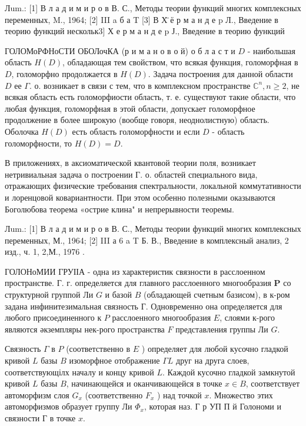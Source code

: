 \documentclass[10pt]{article}
\begin{document}
Лum.: [1] В л а д и м и р о в В. С., Методы теории функций многих комплексных переменных, M., 1964; [2] III a б а T [3] В Х̈ ё р м а н д е p Л., Введение в теорию функций нескольк3] Х е р м а н д е p Ј., Введение в теорию функций



ГОЛОМоРФНоСТИ ОБОЛочКА (р и м а н о в о й) о б л а с т и $D$ - наибольшая область $H(D)$, обладающая тем свойством, что всякая функция, голоморфная в $D$, голоморфно продолжается в $H(D)$. Задача построения для данной области $D$ ее $\Gamma$. о. возникает в связи с тем, что в комплексном пространстве $\mathbb{C}^{n}, n \geqslant 2$, не всякая область есть голоморфиости область, т. е. существуют такие области, что любая функция, голоморфная в этой области, допускает голоморфное продолжение в более широкую (вообще говоря, неоднолистную) область. Оболочка $H(D)$ есть область голоморфности и если $D$ - область голоморфности, то $H(D)=D$.



В приложениях, в аксиоматической квантовой теории поля, возникает нетривиальная задача о построении Г. о. областей специального вида, отражающих физические требования спектральности, локальной коммутативности и лоренцовой ковариантности. При этом особенно полезными оказываются Боголюбова теорема «острие клина" и непрерывности теоремы.



Лum.: [1] В л а д и м и р о в В. С., Методы теории функций многих комплексных переменных, М., 1964; [2] III а 6 a T Б. В., Введение в комплексный анализ, 2 изд., ч. 1, 2,М., 1976 .



ГОЛОНоМИИ ГРУІІА - одна из характеристик связности в расслоенном пространстве. Г. г. определяется для главного расслоенного многообразия $\boldsymbol{P}$ со структурной группой Ли $G$ и базой $B$ (обладающей счетным базисом), в к-ром задана инфинитезимальная связность $Г$. Одновременно она определяется для любого присоединенного к $P$ расслоенного многообразия $E$, слоями к-рого являются әкземпляры нек-рого пространства $F$ представления группы Ли $G$.



Связность $\Gamma$ в $P$ (соответственно в $E$ ) определяет для любой кусочно гладкой кривой $L$ базы $B$ изоморфное отображение $\Gamma L$ друг на друга слоев, соответствующілх началу и концу кривой $L$. Каждой кусочно гладкой замкнутой кривой $L$ базы $B$, начинающейся и оканчивающейся в точке $x \in B$, соответствует автоморфизм слоя $G_{x}$ (соответственно $F_{x}$ ) над точкой $x$. Множество этих автоморфизмов образует группу Ли $\Phi_{x}$, которая наз. Г р УП П й Голономи и связности $Г$ в точке $x$.
\end{document}
